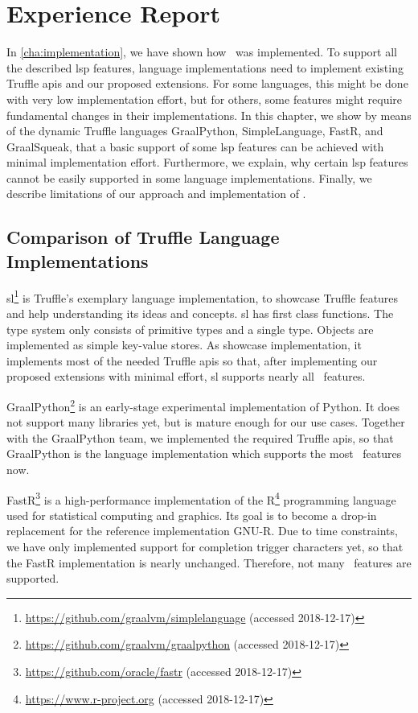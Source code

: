 
\section{Experience Report}
\label{cha:evaluation}

In \autoref{cha:implementation}, we have shown how \graallsp~was implemented. To support all the described \ac{lsp} features, language implementations need to implement existing Truffle \acp{api} and our proposed extensions. For some languages, this might be done with very low implementation effort, but for others, some features might require fundamental changes in their implementations. In this chapter, we show by means of the dynamic Truffle languages GraalPython, SimpleLanguage, FastR, and GraalSqueak, that a basic support of some \ac{lsp} features can be achieved with minimal implementation effort. Furthermore, we explain, why certain \ac{lsp} features cannot be easily supported in some language implementations. Finally, we describe limitations of our approach and implementation of \graallsp. 

\subsection{Comparison of Truffle Language Implementations}
\label{sec:xp:ComparisonOfLangImpls}

\acf{sl}\footnote{\url{https://github.com/graalvm/simplelanguage} (accessed 2018-12-17)} is Truffle's exemplary language implementation, to showcase Truffle features and help understanding its ideas and concepts. \ac{sl} has first class functions. The type system only consists of primitive types and a single  type. Objects are implemented as simple key-value stores. As showcase implementation, it implements most of the needed Truffle \acp{api} so that, after implementing our proposed extensions with minimal effort, \ac{sl} supports nearly all \graallsp~features.

GraalPython\footnote{\url{https://github.com/graalvm/graalpython} (accessed 2018-12-17)} is an early-stage experimental implementation of Python. It does not support many libraries yet, but is mature enough for our use cases. Together with the GraalPython team, we implemented the required Truffle \acp{api}, so that GraalPython is the language implementation which supports the most \graallsp~features now.

FastR\footnote{\url{https://github.com/oracle/fastr} (accessed 2018-12-17)} is a high-performance implementation of the R\footnote{\url{https://www.r-project.org} (accessed 2018-12-17)} programming language used for statistical computing and graphics. Its goal is to become a drop-in replacement for the reference implementation GNU-R. Due to time constraints, we have only implemented support for completion trigger characters yet, so that the FastR implementation is nearly unchanged. Therefore, not many \graallsp~features are supported.


